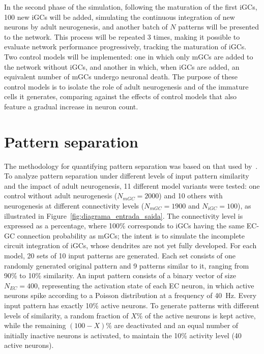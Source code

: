 In the second phase of the simulation, following the maturation of the first iGCs, 100 new iGCs will be added, simulating the
continuous integration of new neurons by adult neurogenesis, and another batch of $N$ patterns will be presented to the
network. This process will be repeated 3 times, making it possible to evaluate network performance progressively, tracking the
maturation of iGCs. Two control models will be implemented: one in which only mGCs are added to the network without iGCs, and
another in which, when iGCs are added, an equivalent number of mGCs undergo neuronal death. The purpose of these control models
is to isolate the role of adult neurogenesis and of the immature cells it generates, comparing against the effects of control
models that also feature a gradual increase in neuron count.


\section{Pattern separation}\label{sec:separacao_padroes}

The methodology for quantifying pattern separation was based on that used by~\textcite{kimEffect2024}. To analyze pattern
separation under different levels of input pattern similarity and the impact of adult neurogenesis, 11 different model variants
were tested: one control without adult neurogenesis ($N_{mGC} = 2000$) and 10 others with neurogenesis at different
connectivity levels ($N_{mGC} = 1900$ and $N_{iGC} = 100$), as illustrated in Figure~\ref{fig:diagrama_entrada_saida}. The
connectivity level is expressed as a percentage, where 100\% corresponds to iGCs having the same EC-GC connection probability
as mGCs; the intent is to simulate the incomplete circuit integration of iGCs, whose dendrites are not yet fully developed. For
each model, 20 sets of 10 input patterns are generated. Each set consists of one randomly generated original pattern and 9
patterns similar to it, ranging from 90\% to 10\% similarity. An input pattern consists of a binary vector of size
$N_{EC} = 400$, representing the activation state of each EC neuron, in which active neurons spike according to a Poisson
distribution at a frequency of \SI{40}{\hertz}. Every input pattern has exactly 10\% active neurons. To generate patterns with
different levels of similarity, a random fraction of $X\%$ of the active neurons is kept active, while the remaining
$(100 - X)\%$ are deactivated and an equal number of initially inactive neurons is activated, to maintain the 10\% activity
level (40 active neurons).

